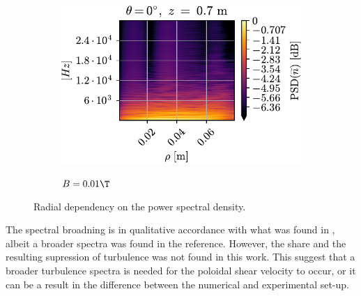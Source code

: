 \begin{figure}[htbp]
\begin{subfigure}[h]{0.45\textwidth}
        \includegraphics[width=1.0\textwidth]{fig/results/poloidalFlow/PSD2D01}
        \label{fig:PSD2D008B}
        \caption{$B=0.01\T$}
    \end{subfigure}
    \caption{Radial dependency on the power spectral density.}
    \label{fig:PSD2D}
\end{figure}
%
The spectral broadning is in qualitative accordance with what was found in \cite{Tynan2006a}, albeit a broader spectra was found in the reference.
However, the share and the resulting supression of turbulence was not found in this work.
This suggest that a broader turbulence spectra is needed for the poloidal shear velocity to occur, or it can be a result in the difference between the numerical and experimental set-up.
